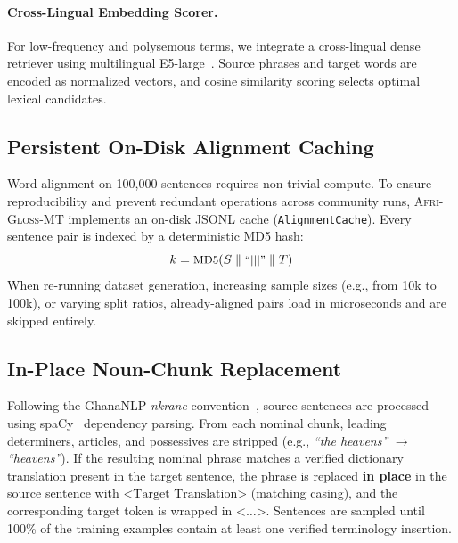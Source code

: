 \documentclass[10pt,twocolumn]{article}
\newcommand{\agm}{\textsc{Afri-Gloss-MT}}
\newcommand{\term}[1]{\texttt{<}#1\texttt{>}}
\begin{document}
\paragraph{Cross-Lingual Embedding Scorer.} For low-frequency and polysemous terms, we integrate a cross-lingual dense retriever using multilingual E5-large~\cite{wang2024e5}. Source phrases and target words are encoded as normalized vectors, and cosine similarity scoring selects optimal lexical candidates.

\subsection{Persistent On-Disk Alignment Caching}
Word alignment on 100,000 sentences requires non-trivial compute. To ensure reproducibility and prevent redundant operations across community runs, \agm{} implements an on-disk JSONL cache (\texttt{AlignmentCache}). Every sentence pair is indexed by a deterministic MD5 hash:
\begin{equation}
\small
k = \text{MD5}(S \parallel \text{``|||''} \parallel T)
\end{equation}
When re-running dataset generation, increasing sample sizes (e.g., from 10k to 100k), or varying split ratios, already-aligned pairs load in microseconds and are skipped entirely.

\subsection{In-Place Noun-Chunk Replacement}
Following the GhanaNLP \emph{nkrane} convention~\cite{owusu2024glossmt}, source sentences are processed using spaCy~\cite{honnibal2020spacy} dependency parsing. From each nominal chunk, leading determiners, articles, and possessives are stripped (e.g., \emph{``the heavens''} $\rightarrow$ \emph{``heavens''}). If the resulting nominal phrase matches a verified dictionary translation present in the target sentence, the phrase is replaced \textbf{in place} in the source sentence with $\term{\text{Target Translation}}$ (matching casing), and the corresponding target token is wrapped in $\term{\dots}$. Sentences are sampled until 100\% of the training examples contain at least one verified terminology insertion.
\end{document}
